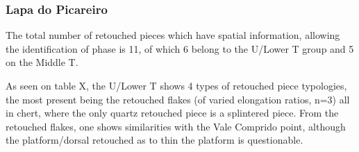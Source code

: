 \documentclass[12pt,twoside]{reedthesis}
\begin{document}
\hypertarget{lapa-do-picareiro-7}{%
\subsubsection{Lapa do Picareiro}\label{lapa-do-picareiro-7}}

The total number of retouched pieces which have spatial information, allowing the identification of phase is 11, of which 6 belong to the U/Lower T group and 5 on the Middle T.

As seen on table X, the U/Lower T shows 4 types of retouched piece typologies, the most present being the retouched flakes (of varied elongation ratios, n=3) all in chert, where the only quartz retouched piece is a splintered piece. From the retouched flakes, one shows similarities with the Vale Comprido point, although the platform/dorsal retouched as to thin the platform is questionable.
\end{document}
